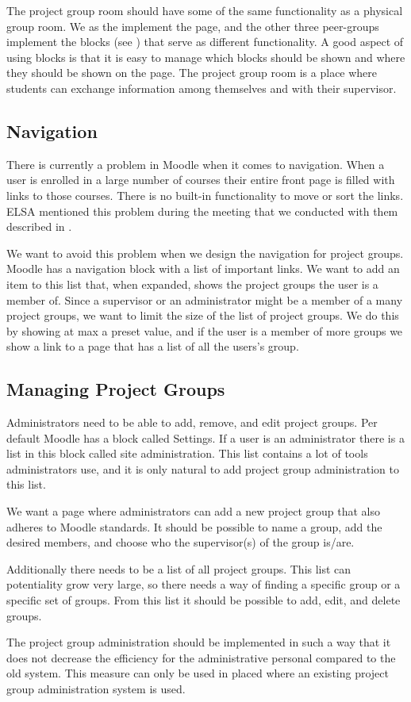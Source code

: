 The project group room should have some of the same functionality as a physical group room.
We as the \groupname{} implement the page, and the other three peer-groups implement the blocks (see ) that serve as different functionality.
A good aspect of using blocks is that it is easy to manage which blocks should be shown and where they should be shown on the page.
The project group room is a place where students can exchange information among themselves and with their supervisor.

\subsection{Navigation}
\label{sub:designprojectgroupnavigation}
There is currently a problem in Moodle when it comes to navigation. 
When a user is enrolled in a large number of courses their entire front page is filled with links to those courses.
There is no built-in functionality to move or sort the links.
ELSA mentioned this problem during the meeting that we conducted with them described in .

We want to avoid this problem when we design the navigation for project groups.
Moodle has a navigation block with a list of important links.
We want to add an item to this list that, when expanded, shows the project groups the user is a member of.
Since a supervisor or an administrator might be a member of a many project groups, we want to limit the size of the list of project groups.
We do this by showing at max a preset value, and if the user is a member of more groups we show a link to a page that has a list of all the users's group.

\subsection{Managing Project Groups}
\label{sec:s}
Administrators need to be able to add, remove, and edit project groups.
Per default Moodle has a block called Settings. 
If a user is an administrator there is a list in this block called site administration. 
This list contains a lot of tools administrators use, and it is only natural to add project group administration to this list. 

We want a page where administrators can add a new project group that also adheres to Moodle standards.
It should be possible to name a group, add the desired members, and choose who the supervisor(s) of the group is/are.

Additionally there needs to be a list of all project groups.
This list can potentiality grow very large, so there needs a way of finding a specific group or a specific set of groups. 
From this list it should be possible to add, edit, and delete groups. 

The project group administration should be implemented in such a way that it does not decrease the efficiency for the administrative personal compared to the old system. 
This measure can only be used in placed where an existing project group administration system is used.